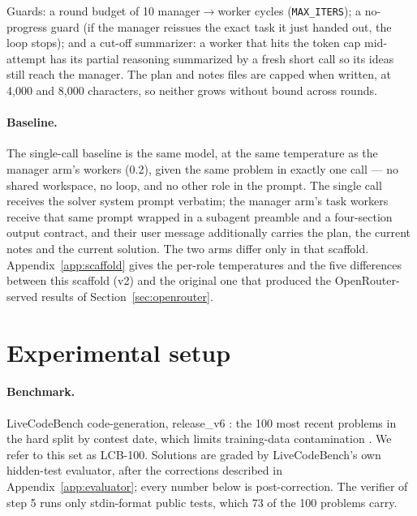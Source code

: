 \documentclass{article}
\begin{document}
Guards: a round budget of 10 manager$\to$worker cycles
(\texttt{MAX\_ITERS}); a no-progress guard (if the manager reissues the exact task it just
handed out, the loop stops); and a cut-off summarizer: a worker that hits the token cap
mid-attempt has its partial reasoning summarized by a fresh short call so its ideas still
reach the manager. The plan and notes files are capped when written, at 4,000 and 8,000
characters, so neither grows without bound across rounds.

\paragraph{Baseline.} The single-call baseline is the same model, at the same temperature as
the manager arm's workers (0.2), given the same problem in exactly one call --- no shared
workspace, no loop, and no other role in the prompt. The single call receives the solver
system prompt verbatim; the manager arm's task workers receive that same prompt wrapped in a
subagent preamble and a four-section output contract, and their user message additionally
carries the plan, the current notes and the current solution. The two arms differ only in
that scaffold. Appendix~\ref{app:scaffold} gives the per-role temperatures and the five
differences between this scaffold (v2) and the original one that produced the
OpenRouter-served results of Section~\ref{sec:openrouter}.

\section{Experimental setup}
\label{sec:setup}

\paragraph{Benchmark.} LiveCodeBench code-generation, release\_v6 \citep{jain2024}: the 100
most recent problems in the hard split by contest date, which limits training-data
contamination \citep{jain2024}. We refer to this set as LCB-100. Solutions are graded by
LiveCodeBench's own hidden-test evaluator, after the corrections described in
Appendix~\ref{app:evaluator}; every number below is post-correction. The verifier of step 5
runs only stdin-format public tests, which 73 of the 100 problems carry.
\end{document}
